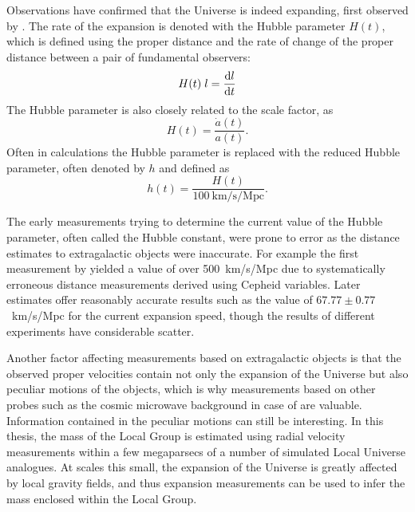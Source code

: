 \documentclass[english, oneside]{HYgradu}
\begin{document}
Observations have confirmed that the Universe is indeed expanding, first observed by \citet{hubble1929relation}. The rate of the expansion is denoted with the Hubble parameter $H(t)$, which is defined using the proper distance and the rate of change of the proper distance between a pair of fundamental observers:
\begin{equation}
H(t)\; l = \dv{l}{t}
\end{equation}
The Hubble parameter is also closely related to the scale factor, as \citep{mo2010galaxy}
\begin{equation}\label{reducedhubble}
H(t) = \frac{\dot{a}(t)}{a(t)}.
\end{equation}
Often in calculations the Hubble parameter is replaced with the reduced Hubble parameter, often denoted by $h$ and defined as \citep{montgomery2012introduction}
\begin{equation}
h(t) = \frac{H(t)}{100\ \mathrm{km/s/Mpc}}.
\end{equation}


The early measurements trying to determine the current value of the Hubble parameter, often called the Hubble constant, were prone to error as the distance estimates to extragalactic objects were inaccurate. For example the first measurement by \citet{hubble1929relation} yielded a value of over 500~km/s/Mpc due to systematically erroneous distance measurements derived using Cepheid variables. Later estimates offer reasonably accurate results such as the \citet{planck2014resultsXVI} value of $67.77 \pm 0.77$~km/s/Mpc for the current expansion speed, though the results of different experiments have considerable scatter.

Another factor affecting measurements based on extragalactic objects is that the observed proper velocities contain not only the expansion of the Universe but also peculiar motions of the objects, which is why measurements based on other probes such as the cosmic microwave background in case of \citet{planck2016resultsI} are valuable. Information contained in the peculiar motions can still be interesting. In this thesis, the mass of the Local Group is estimated using radial velocity measurements within a few megaparsecs of a number of simulated Local Universe analogues. At scales this small, the expansion of the Universe is greatly affected by local gravity fields, and thus expansion measurements can be used to infer the mass enclosed within the Local Group.
\end{document}
